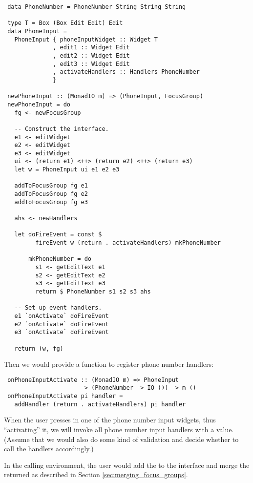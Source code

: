 \begin{verbatim}
 data PhoneNumber = PhoneNumber String String String

 type T = Box (Box Edit Edit) Edit
 data PhoneInput =
   PhoneInput { phoneInputWidget :: Widget T
              , edit1 :: Widget Edit
              , edit2 :: Widget Edit
              , edit3 :: Widget Edit
              , activateHandlers :: Handlers PhoneNumber
              }

 newPhoneInput :: (MonadIO m) => (PhoneInput, FocusGroup)
 newPhoneInput = do
   fg <- newFocusGroup

   -- Construct the interface.
   e1 <- editWidget
   e2 <- editWidget
   e3 <- editWidget
   ui <- (return e1) <++> (return e2) <++> (return e3)
   let w = PhoneInput ui e1 e2 e3

   addToFocusGroup fg e1
   addToFocusGroup fg e2
   addToFocusGroup fg e3

   ahs <- newHandlers

   let doFireEvent = const $
         fireEvent w (return . activateHandlers) mkPhoneNumber

       mkPhoneNumber = do
         s1 <- getEditText e1
         s2 <- getEditText e2
         s3 <- getEditText e3
         return $ PhoneNumber s1 s2 s3 ahs

   -- Set up event handlers.
   e1 `onActivate` doFireEvent
   e2 `onActivate` doFireEvent
   e3 `onActivate` doFireEvent

   return (w, fg)
\end{verbatim}

Then we would provide a function to register phone number handlers:

\begin{verbatim}
 onPhoneInputActivate :: (MonadIO m) => PhoneInput
                      -> (PhoneNumber -> IO ()) -> m ()
 onPhoneInputActivate pi handler =
   addHandler (return . activateHandlers) pi handler
\end{verbatim}

When the user presses  in one of the phone number input
widgets, thus ``activating'' it, we will invoke all phone number input
handlers with a  value.  (Assume that we would also do
some kind of validation and decide whether to call the handlers
accordingly.)

In the calling environment, the user would add the
 to the interface and merge the returned
 as described in Section
\ref{sec:merging_focus_groups}.
